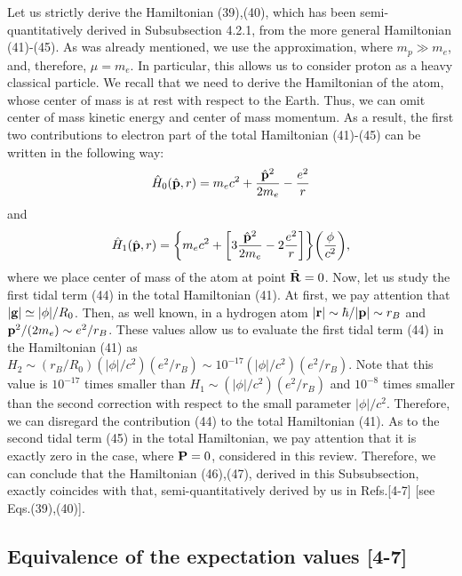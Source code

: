 \documentclass{ws-ijmpd}
\begin{document}
Let us strictly derive the Hamiltonian (39),(40), which has been
semi-quantitatively derived in Subsubsection 4.2.1, from the more
general Hamiltonian (41)-(45). As was already mentioned, we use
the approximation, where $m_p \gg m_e$, and, therefore, $\mu =
m_e$. In particular, this allows us to consider proton as a heavy
classical particle. We recall that we need to derive the
Hamiltonian of the atom, whose center of mass is at rest with
respect to the Earth. Thus, we can omit center of mass kinetic
energy and center of mass momentum. As a result, the first two
contributions to electron part of the total Hamiltonian (41)-(45)
can be written in the following way:
\begin{equation}
\hat H_0 (\hat {\bf p}, r) = m_e c^2 + \frac{\hat {\bf p}^2}{2m_e}
- \frac{e^2}{r}
\end{equation}
and
\begin{equation}
\hat H_1 (\hat {\bf p}, r) =  \biggl\{ m_e c^2 + \biggl[3
\frac{\hat {\bf p}^2}{2 m_e} - 2 \frac{e^2}{r} \biggl]\biggl\}
\biggl( \frac{\phi}{c^2} \biggl),
\end{equation}
where we place center of mass of the atom at point $\tilde {\bf R}
= 0$. Now, let us study the first tidal term (44) in the total
Hamiltonian (41). At first, we pay attention that $|{\bf g}|
\simeq |\phi|/R_0$. Then, as well known, in a hydrogen atom
$|{\bf r}| \sim \hbar / |{\bf p}| \sim r_B$ and ${\bf p}^2/(2m_e)
\sim e^2/r_B$. These values allow us to evaluate the first tidal
term (44) in the Hamiltonian (41) as $H_2 \sim (r_B/R_0)
(|\phi|/c^2) (e^2/r_B) \sim 10^{-17} (|\phi|/c^2) (e^2/r_B)$. Note
that this value is $10^{-17}$ times smaller than $H_1 \sim
(|\phi|/c^2) (e^2/r_B)$ and $10^{-8}$ times smaller than the
second correction with respect to the small parameter
$|\phi|/c^2$. Therefore, we can disregard the
contribution (44) to the total Hamiltonian (41). As to the
second tidal term (45) in the total Hamiltonian, we pay attention
that it is exactly zero in the case, where ${\bf P}=0$, considered
in this review. Therefore, we can conclude that the Hamiltonian
(46),(47), derived in this Subsubsection, exactly coincides with
that, semi-quantitatively derived by us in Refs.[4-7] [see
Eqs.(39),(40)].



\subsection{Equivalence of the expectation values [4-7]}
\end{document}
